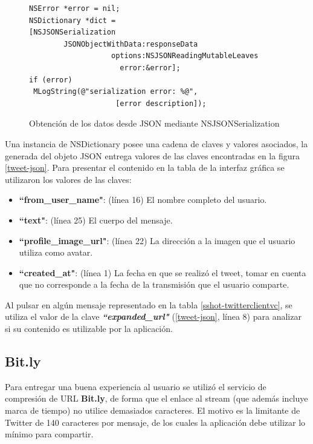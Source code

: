 \begin{figure}[H]
	\centering
\begin{lstlisting}
NSError *error = nil;
NSDictionary *dict =
[NSJSONSerialization 
		JSONObjectWithData:responseData 
				   options:NSJSONReadingMutableLeaves
                   	 error:&error];
if (error) 
 MLogString(@"serialization error: %@",
 					[error description]);
\end{lstlisting}
	\caption{Obtención de los datos desde JSON mediante NSJSONSerialization}
	\label{json-serialization}
\end{figure}	

Una instancia de NSDictionary posee una cadena de claves y valores asociados, la generada del objeto JSON entrega valores de las claves encontradas en la figura \ref{tweet-json}.
Para presentar el contenido en la tabla de la interfaz gráfica se utilizaron los valores de las claves:
\begin{itemize}
\item \textbf{\textquotedblleft from\_user\_name"}: (línea 16) El nombre completo del usuario.
\item \textbf{\textquotedblleft text"}: (línea 25) El cuerpo del mensaje.
\item \textbf{\textquotedblleft profile\_image\_url"}: (línea 22) La dirección a la imagen que el usuario utiliza como avatar.
\item \textbf{\textquotedblleft created\_at"}: (línea 1) La fecha en que se realizó el tweet, tomar en cuenta que no corresponde a la fecha de la transmisión que el usuario comparte. 
\end{itemize}
Al pulsar en algún mensaje representado en la tabla \ref{sshot-twitterclientvc}, se utiliza el valor de la clave \textit{\textbf{\textquotedblleft expanded\_url"}} (\ref{tweet-json}, línea 8) para analizar si su contenido es utilizable por la aplicación.

	\subsection{Bit.ly}
Para entregar una buena experiencia al usuario se utilizó el servicio de compresión de URL \textbf{Bit.ly}, de forma que el enlace al stream (que además incluye marca de tiempo) no utilice demasiados caracteres. El motivo es la limitante de Twitter de 140 caracteres por mensaje, de los cuales la aplicación debe utilizar lo mínimo para compartir.\\

